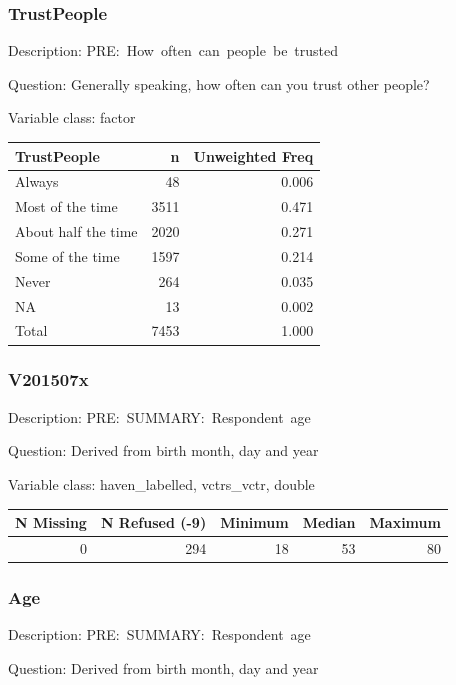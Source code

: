 \documentclass[
]{krantz}
\begin{document}
\hypertarget{trustpeople}{%
\subsubsection*{TrustPeople}\label{trustpeople}}


Description: PRE:~How~often~can~people~be~trusted

Question: Generally speaking, how often can you trust other people?

Variable class: factor

\begin{tabular}[t]{l|r|r}
\hline
TrustPeople & n & Unweighted Freq\\
\hline
Always & 48 & 0.006\\
\hline
Most of the time & 3511 & 0.471\\
\hline
About half the time & 2020 & 0.271\\
\hline
Some of the time & 1597 & 0.214\\
\hline
Never & 264 & 0.035\\
\hline
NA & 13 & 0.002\\
\hline
Total & 7453 & 1.000\\
\hline
\end{tabular}

\hypertarget{v201507x}{%
\subsubsection*{V201507x}\label{v201507x}}


Description: PRE:~SUMMARY:~Respondent~age

Question: Derived from birth month, day and year

Variable class: haven\_labelled, vctrs\_vctr, double

\begin{tabular}[t]{r|r|r|r|r}
\hline
N Missing & N Refused (-9) & Minimum & Median & Maximum\\
\hline
0 & 294 & 18 & 53 & 80\\
\hline
\end{tabular}

\hypertarget{age}{%
\subsubsection*{Age}\label{age}}


Description: PRE:~SUMMARY:~Respondent~age

Question: Derived from birth month, day and year
\end{document}

